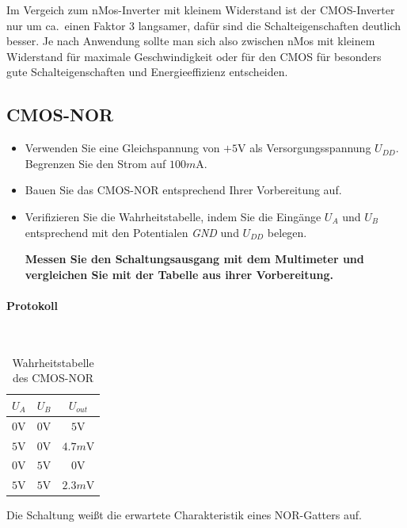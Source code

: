 \documentclass[10pt]{scrreprt}
\begin{document}
    Im Vergeich zum nMos-Inverter mit kleinem Widerstand ist der CMOS-Inverter nur
    um ca.~einen Faktor 3 langsamer, dafür sind die Schalteigenschaften deutlich
    besser. Je nach Anwendung sollte man sich also zwischen nMos mit kleinem Widerstand
    für maximale Geschwindigkeit oder für den CMOS für besonders gute Schalteigenschaften
    und Energieeffizienz entscheiden.


    \subsection{CMOS-NOR}
    \begin{itemize}
        \item Verwenden Sie eine Gleichspannung von $+5\si{\volt}$ als Versorgungsspannung $U_{DD}$.
            Begrenzen Sie den Strom auf $100\si{m\ampere}$.
        \item Bauen Sie das CMOS-NOR entsprechend Ihrer Vorbereitung auf.
        \item Verifizieren Sie die Wahrheitstabelle, indem Sie die Eingänge $U_A$ und $U_B$
            entsprechend mit den Potentialen \textit{GND} und $U_{DD}$ belegen.

            \vspace{0.1cm}

            \textbf{
                Messen Sie den Schaltungsausgang mit dem Multimeter und vergleichen
                Sie mit der Tabelle aus ihrer Vorbereitung.
            }
    \end{itemize}

    \paragraph{Protokoll}
    $ $
    \begin{table}[H]
        \centering
        \begin{tabular}{ccc}
        \toprule
        $U_A$ & $U_B$ & $U_{out}$\\
        \midrule
        $0\si{\volt}$ & $0\si{\volt}$ & $5\si{\volt}$\\
        $5\si{\volt}$ & $0\si{\volt}$ & $4.7\si{m\volt}$\\
        $0\si{\volt}$ & $5\si{\volt}$ & $0\si{\volt}$\\
        $5\si{\volt}$ & $5\si{\volt}$ & $2.3\si{m\volt}$\\
        \bottomrule
        \end{tabular}
        \caption{Wahrheitstabelle des CMOS-NOR}
    \end{table}

    Die Schaltung weißt die erwartete Charakteristik eines NOR-Gatters auf.
\end{document}
